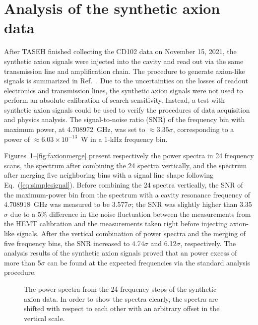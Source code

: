 \section{Analysis of the synthetic axion data}
After TASEH finished collecting the CD102 data on November 15, 2021, 
the synthetic axion signals were injected into the cavity and read out via the 
same transmission line and amplification chain. The procedure 
to generate axion-like signals is summarized in 
Ref.~\cite{TASEHInstrumentation}. 
Due to the uncertainties on the losses of readout electronics and transmission
 lines, the synthetic axion signals were not used to perform an absolute 
calibration of search sensitivity. Instead, 
a test with synthetic axion signals could be used to verify the procedures of 
data acquisition and physics analysis. The 
signal-to-noise ratio (SNR) of the frequency bin with maximum power, at 
4.708972~GHz, was set to $\approx 3.35\sigma$, corresponding to 
a power of $\approx 6.03 \times 10^{-13}$~W in a 1-kHz frequency bin.  

Figures~\ref{fig:faxionstep}--\ref{fig:faxionmerge} present respectively the 
power spectra in 24 frequency scans, the spectrum after combining the 24 
spectra vertically, and the spectrum after merging five neighboring bins with 
a signal line shape following Eq.~(\ref{eq:simplesignal}). Before combining 
the 24 spectra vertically, the SNR of the maximum-power bin from the spectrum 
with a cavity resonance frequency of 4.708918~GHz was measured to be 
3.577$\sigma$; the SNR was slightly higher than 3.35$\sigma$ due to a 
5\% difference in the noise fluctuation between the measurements from 
the HEMT calibration and the measurements taken 
right before injecting axion-like signals. After the vertical combination 
of power spectra and the merging of five frequency bins, the SNR increased to 
4.74$\sigma$ and 6.12$\sigma$, respectively. 
The analysis results of the synthetic axion signals proved that an power 
excess of more than 5$\sigma$ can be found at the expected frequencies via 
the standard analysis procedure.  

\begin{figure}[htbp]                                                                                                  
    \centering                                                                                                                       
 \caption{The power spectra from the 24 frequency steps of the synthetic axion 
data. In order to show the spectra clearly, the spectra are shifted 
with respect to each other with an arbitrary offset in the vertical scale.}                
\label{fig:faxionstep}                                                                                                            
\end{figure}                       

